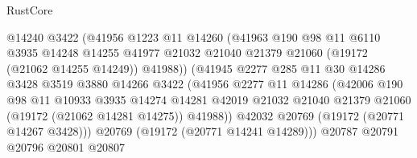 \begin{lexlean}{RustCore}
\begin{coremodule}
                                @14240
                                @3422
                                (@41956
                                  @1223
                                  @11
                                  @14260
                                  (@41963
                                    @190
                                    @98
                                    @11
                                    @6110
                                    @3935
                                    @14248
                                    @14255
                                    @41977
                                    @21032
                                    @21040
                                    @21379
                                    @21060
                                    (@19172 (@21062 @14255 @14249))
                                    @41988))
                                (@41945
                                  @2277
                                  @285
                                  @11
                                  @30
                                  @14286
                                  @3428
                                  @3519
                                  @3880
                                  @14266
                                  @3422
                                  (@41956
                                    @2277
                                    @11
                                    @14286
                                    (@42006
                                      @190
                                      @98
                                      @11
                                      @10933
                                      @3935
                                      @14274
                                      @14281
                                      @42019
                                      @21032
                                      @21040
                                      @21379
                                      @21060
                                      (@19172 (@21062 @14281 @14275))
                                      @41988))
                                  @42032
                                  @20769
                                  (@19172 (@20771 @14267 @3428)))
                                @20769
                                (@19172 (@20771 @14241 @14289)))
                              @20787
                              @20791
                              @20796
                              @20801
                              @20807

\end{coremodule}
\end{lexlean}
